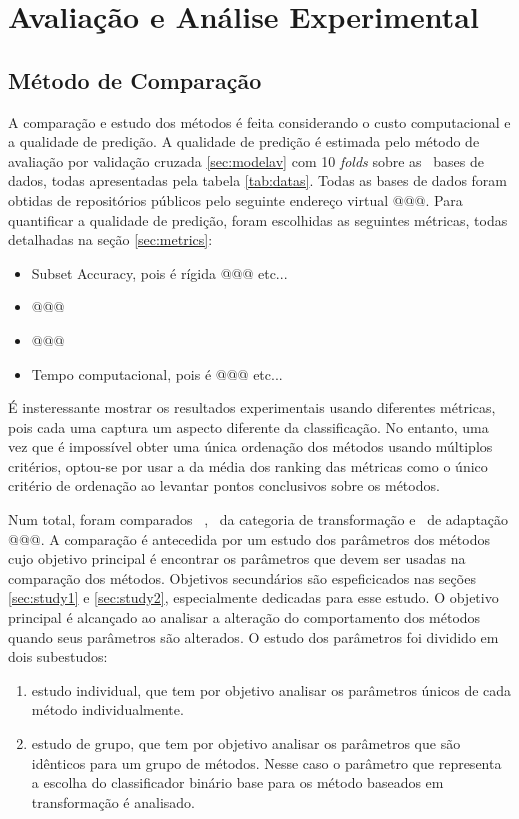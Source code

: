 \chapter{Avaliação e Análise Experimental}
\section{Método de Comparação}
\label{sec:methodcomp}

A comparação e estudo dos métodos é feita considerando o custo computacional e a qualidade de predição.
A qualidade de predição é estimada pelo método de avaliação por validação cruzada \ref{sec:modelav} com 10 \textit{folds}
sobre as \Nbases~bases de dados, todas apresentadas pela tabela \ref{tab:datas}.
Todas as bases de dados foram obtidas de repositórios públicos pelo seguinte
endereço virtual @@@.
Para quantificar a qualidade de predição, foram escolhidas as seguintes métricas, todas detalhadas na seção \ref{sec:metrics}:

\begin{itemize}
 \item Subset Accuracy, pois é rígida @@@ etc...
 \item @@@
 \item @@@
 \item Tempo computacional, pois é @@@ etc...
\end{itemize}

É insteressante mostrar os resultados experimentais usando diferentes métricas, pois cada uma captura
um aspecto diferente da classificação.
No entanto, uma vez que é impossível obter uma única ordenação dos métodos
usando múltiplos critérios,
optou-se por usar a da média dos ranking das métricas como
o único critério de ordenação ao levantar pontos conclusivos sobre os métodos. 

Num total, foram comparados \Nml~\MML, \NmlT~da categoria de transformação e \NmlA~de adaptação @@@.
A comparação é antecedida por um estudo dos parâmetros dos métodos
cujo objetivo principal é encontrar os parâmetros que devem ser usadas na comparação dos métodos. Objetivos secundários são
espeficicados nas seções \ref{sec:study1} e \ref{sec:study2}, especialmente dedicadas para esse estudo.
O objetivo principal é alcançado ao analisar a alteração do comportamento dos métodos quando seus parâmetros são alterados.
O estudo dos parâmetros foi dividido em dois subestudos:
\begin{enumerate}
 \item estudo individual, que tem por objetivo analisar os parâmetros únicos de cada método individualmente.
  \item estudo de grupo, que tem por objetivo analisar os parâmetros que são idênticos para um grupo de métodos.
  Nesse caso o parâmetro que representa a escolha do classificador binário base para os método baseados em transformação é
  analisado. 
\end{enumerate}

